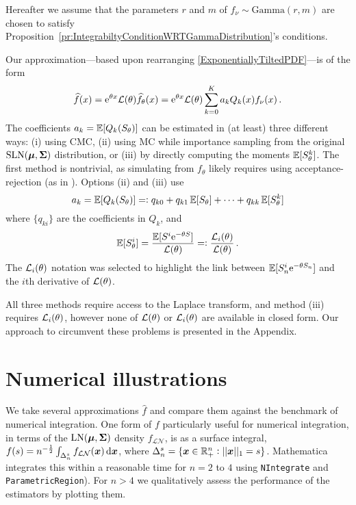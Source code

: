 Hereafter we assume that the parameters $r$ and $m$ of $f_\nu \sim \mathrm{Gamma}(r,m)$ are chosen to satisfy Proposition~\ref{pr:IntegrabiltyConditionWRTGammaDistribution}'s conditions.

Our approximation---based upon rearranging \eqref{ExponentiallyTiltedPDF}---is of the form
\begin{equation}\label{fGammaApprox}
 \widehat{f}(x) = \mathrm{e}^{\theta x} \mathcal{L}(\theta) \widehat{f}_\theta(x) = \mathrm{e}^{\theta x} \mathcal{L}(\theta) \sum_{k=0}^K a_k Q_k(x) f_\nu(x) \,.
\end{equation}
The coefficients $a_k = \operatorname{{\mathbb E}} [Q_k(S_\theta)]$ can be estimated in (at least) three different ways: (i) using CMC, (ii) using MC while importance sampling from the original $\mathrm{SLN}(\bm{\mu}, \bm{\Sigma})$ distribution, or (iii) by directly computing the moments $\operatorname{{\mathbb E}}[S_\theta^k]$. The first method is nontrivial, as simulating from $f_\theta$ likely requires using acceptance-rejection (as in \cite{asmussen2015exponential}). Options (ii) and (iii) use
\begin{equation} \label{eq:expand_coeffs}
	a_k = \operatorname{{\mathbb E}} [Q_k(S_\theta)] =: q_{k0} + q_{k1} \operatorname{{\mathbb E}}[S_\theta] + \dots + q_{kk} \operatorname{{\mathbb E}}[S_\theta^k]
\end{equation}
where $\{q_{ki}\}$ are the coefficients in $Q_k$, and
\[
\operatorname{{\mathbb E}}[S_\theta^i] = \frac{\operatorname{{\mathbb E}}[S^i \mathrm{e}^{-\theta S}]}{\mathcal{L}(\theta)} =: \frac{\mathcal{L}_i(\theta)}{\mathcal{L}(\theta)} \,.
\]
The $\mathcal{L}_i(\theta)$ notation was selected to highlight the link between $\operatorname{{\mathbb E}}[S_n^i \mathrm{e}^{-\theta S_n}]$ and the $i$th derivative of $\mathcal{L}(\theta)$.

All three methods require access to the Laplace transform, and method (iii) requires $\mathcal{L}_i(\theta)$, however none of $\mathcal{L}(\theta)$ or $\mathcal{L}_i(\theta)$ are available in closed form. Our approach to circumvent these problems is presented in the Appendix.

\section{Numerical illustrations}\label{S:numerical}

We take several approximations $\widehat{f}$ and compare them against the benchmark of numerical integration.
One form of $f$ particularly useful for numerical integration, in terms of the $\mathrm{LN}(\bm{\mu}, \bm{\Sigma})$ density $f_{\mathcal{LN}}$, is as a surface integral,
$ f(s) = n^{-\frac12} \int_{\Delta_n^s} f_{\mathcal{LN}}(\bfx) \dif \bfx $,
where $\Delta_n^s = \{ \bm{x} \in \mathbb{R}_+^n : ||\bm{x}||_1 = s \}$. Mathematica integrates this within a reasonable time for $n=2$ to $4$ using \texttt{NIntegrate} and \texttt{ParametricRegion}). For $n > 4$ we qualitatively assess the performance of the estimators by plotting them.

